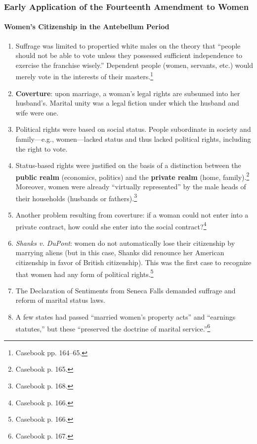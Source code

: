 \subsubsection{Early Application of the Fourteenth Amendment to Women} 

\paragraph{Women's Citizenship in the Antebellum Period}

\begin{enumerate}
    \item Suffrage was limited to propertied white males on the theory that 
    ``people should not be able to vote unless they possessed sufficient 
    independence to exercise the franchise wisely.'' Dependent people (women, 
    servants, etc.) would merely vote in the interests of their 
    masters.\footnote{Casebook pp. 164--65.}
    \item \textbf{Coverture}: upon marriage, a woman's legal rights are 
    subsumed into her husband's. Marital unity was a legal fiction under which 
    the husband and wife were one.
    \item Political rights were based on social status. People subordinate in 
    society and family---e.g., women---lacked status and thus lacked political 
    rights, including the right to vote.
    \item Status-based rights were justified on the basis of a distinction 
    between the \textbf{public realm} (economics, politics) and the 
    \textbf{private realm} (home, family).\footnote{Casebook p. 165.} 
    Moreover, women were already ``virtually represented'' by the male heads 
    of their households (husbands or fathers).\footnote{Casebook p. 168.}
    \item Another problem resulting from coverture: if a woman could not enter 
    into a private contract, how could she enter into the social 
    contract?\footnote{Casebook p. 166.}
    \item \emph{Shanks v. DuPont}: women do not automatically lose their 
    citizenship by marrying aliens (but in this case, Shanks did renounce her 
    American citizenship in favor of British citizenship). This was the first 
    case to recognize that women had any form of political 
    rights.\footnote{Casebook p. 166.}
    \item The Declaration of Sentiments from Seneca Falls demanded suffrage 
    and reform of marital status laws.
    \item A few states had passed ``married women's property acts'' and 
    ``earnings statutes,'' but these ``preserved the doctrine of marital 
    service.''\footnote{Casebook p. 167.}
\end{enumerate}

